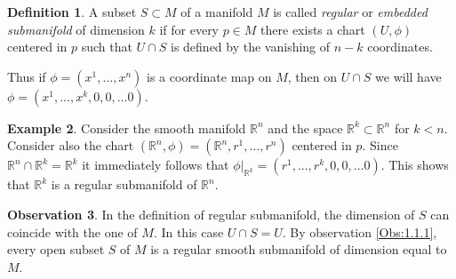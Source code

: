 \documentclass[12pt,a4paper]{report}
\theoremstyle{definition}
\newtheorem{Def}{Definition}[chapter]
\theoremstyle{Theorem}
\theoremstyle{definition}
\newtheorem{Ex}[Def]{Example}
\theoremstyle{definition}
\newtheorem{Obs}[Def]{Observation}
\begin{document}
	\begin{Def}
		A subset $S\subset M$ of a manifold $M$ is called \textit{regular} or \textit{embedded submanifold} of dimension $k$ if for every $p\in M$ there exists a chart $(U,\phi)$ centered in $p$ such that $U\cap S$ is defined by the vanishing of $n-k$ coordinates.
	\end{Def}
	Thus if $\phi=(x^1,...,x^n)$ is a coordinate map on $M$, then on $U\cap S$ we will have $\phi=(x^1,...,x^k,0,0,...0)$.
	\begin{Ex}
		Consider the smooth manifold $\mathbb{R}^n$ and the space $\mathbb{R}^k\subset\mathbb{R}^n$ for $k<n$. Consider also the chart $(\mathbb{R}^n,\phi)=(\mathbb{R}^n,r^1,...,r^n)$ centered in $p$. Since $\mathbb{R}^n\cap \mathbb{R}^k=\mathbb{R}^k$ it immediately follows that $\phi|_{\mathbb{R}^k}=(r^1,...,r^k,0,0,...0)$. This shows that $\mathbb{R}^k$ is a regular submanifold of $\mathbb{R}^n$.
	\end{Ex}
	\begin{Obs} \label{Obs:1.1.2}
		In the definition of regular submanifold, the dimension of $S$ can coincide with the one of $M$. In this case $U\cap S=U$. By observation \ref{Obs:1.1.1}, every open subset $S$ of $M$ is a regular smooth submanifold of dimension equal to $M$.
	\end{Obs}
\end{document}
